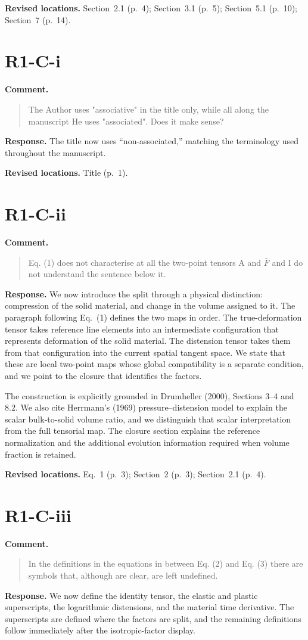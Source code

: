 \documentclass[11pt]{article}
\begin{document}
\textbf{Revised locations.} Section~2.1 (p.~4); Section~3.1 (p.~5); Section~5.1 (p.~10); Section~7 (p.~14).
\section{R1-C-i}
\textbf{Comment.}\begin{quote}\small
The Author uses "associative" in the title only, while all along the manuscript He uses "associated". Does it make sense?
\end{quote}
\textbf{Response.} The title now uses ``non-associated,'' matching the
terminology used throughout the manuscript.

\textbf{Revised locations.} Title (p.~1).
\section{R1-C-ii}
\textbf{Comment.}\begin{quote}\small
Eq. (1) does not characterise at all the two-point tensors A and \(\bar F\) and I do not understand the sentence below it.
\end{quote}
\textbf{Response.} We now introduce the split through a physical distinction:
compression of the solid material, and change in the volume assigned to it. The
paragraph following Eq.~(1) defines the two maps in order. The true-deformation
tensor takes reference line elements into an intermediate configuration that
represents deformation of the solid material. The distension tensor takes them
from that configuration into the current spatial tangent space. We state that
these are local two-point maps whose global compatibility is a separate
condition, and we point to the closure that identifies the factors.

The construction is explicitly grounded in Drumheller (2000), Sections 3--4 and
8.2. We also cite Herrmann's (1969) pressure--distension model to explain the
scalar bulk-to-solid volume ratio, and we distinguish that scalar
interpretation from the full tensorial map. The closure section explains the
reference normalization and the additional evolution information required when
volume fraction is retained.

\textbf{Revised locations.} Eq.~1 (p.~3); Section~2 (p.~3); Section~2.1 (p.~4).
\section{R1-C-iii}
\textbf{Comment.}\begin{quote}\small
In the definitions in the equations in between Eq. (2) and Eq. (3) there are symbols that, although are clear, are left undefined.
\end{quote}
\textbf{Response.} We now define the identity tensor, the elastic and plastic
superscripts, the logarithmic distensions, and the material time derivative.
The superscripts are defined where the factors are split, and the remaining
definitions follow immediately after the isotropic-factor display.
\end{document}
